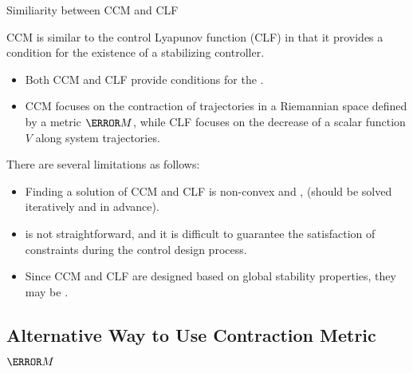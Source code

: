 \begin{frame}{\insertsubsectionhead}{Similiarity between CCM and CLF}

    CCM is similar to the control Lyapunov function (CLF) in that it provides a condition for the existence of a stabilizing controller.

    \begin{itemize}
        \item Both CCM and CLF provide conditions for the .
        \item CCM focuses on the contraction of trajectories in a Riemannian space defined by a metric $\mm{M}$, while CLF focuses on the decrease of a scalar function $V$ along system trajectories.
    \end{itemize} 

    \hfill

    There are several limitations as follows:

    \begin{itemize}
        \item Finding a solution of CCM and CLF is non-convex and , (should be solved iteratively and in advance).
        \item {} is not straightforward, and it is difficult to guarantee the satisfaction of constraints during the control design process.
        \item Since CCM and CLF are designed based on global stability properties, they may be .
    \end{itemize}

\end{frame}

\subsection{Alternative Way to Use Contraction Metric $\mm{M}$}

